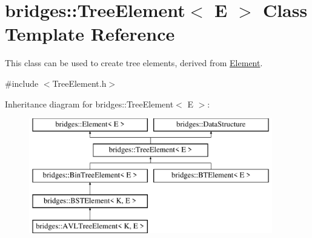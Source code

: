 \hypertarget{classbridges_1_1_tree_element}{}\section{bridges\+:\+:Tree\+Element$<$ E $>$ Class Template Reference}
\label{classbridges_1_1_tree_element}


This class can be used to create tree elements, derived from \mbox{\hyperlink{classbridges_1_1_element}{Element}}.  




{\ttfamily \#include $<$Tree\+Element.\+h$>$}

Inheritance diagram for bridges\+:\+:Tree\+Element$<$ E $>$\+:\begin{figure}[H]
\begin{center}
\leavevmode
\includegraphics[height=5.000000cm]{classbridges_1_1_tree_element}
\end{center}
\end{figure}

